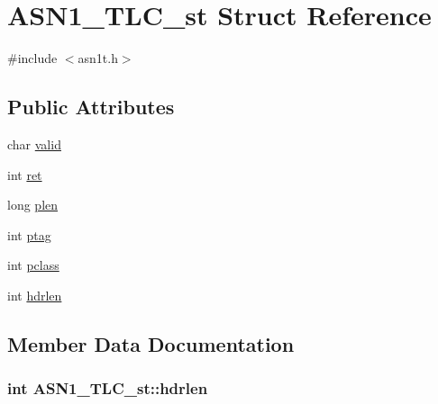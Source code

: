 \hypertarget{struct_a_s_n1___t_l_c__st}{}\section{A\+S\+N1\+\_\+\+T\+L\+C\+\_\+st Struct Reference}
\label{struct_a_s_n1___t_l_c__st}


{\ttfamily \#include $<$asn1t.\+h$>$}

\subsection*{Public Attributes}
\begin{DoxyCompactItemize}
\item 
char \hyperlink{struct_a_s_n1___t_l_c__st_aae7c516be44ce4351b1d5666ac71ab32}{valid}
\item 
int \hyperlink{struct_a_s_n1___t_l_c__st_afea043db523f6ea0ca08eb16668f4992}{ret}
\item 
long \hyperlink{struct_a_s_n1___t_l_c__st_af587b734c7de4809c665bce45fc2b66a}{plen}
\item 
int \hyperlink{struct_a_s_n1___t_l_c__st_a58cd31917a573675361476d87346549a}{ptag}
\item 
int \hyperlink{struct_a_s_n1___t_l_c__st_a33e7ac01afc4ecad3cf6d6d6d8f929f5}{pclass}
\item 
int \hyperlink{struct_a_s_n1___t_l_c__st_aea820e4a42d10f37f8e095af41e0067a}{hdrlen}
\end{DoxyCompactItemize}


\subsection{Member Data Documentation}
\subsubsection[{\texorpdfstring{hdrlen}{hdrlen}}]{\setlength{\rightskip}{0pt plus 5cm}int A\+S\+N1\+\_\+\+T\+L\+C\+\_\+st\+::hdrlen}\hypertarget{struct_a_s_n1___t_l_c__st_aea820e4a42d10f37f8e095af41e0067a}{}\label{struct_a_s_n1___t_l_c__st_aea820e4a42d10f37f8e095af41e0067a}
